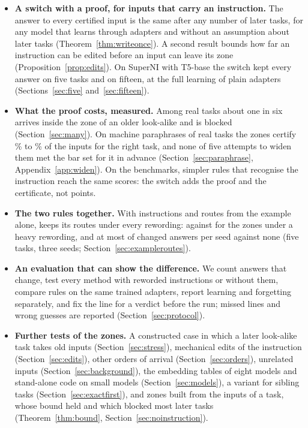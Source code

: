 \begin{itemize}
  then forget \AudFullGainloraFTInt{} and \AudFullInfloraFTInt{} points
  (Sections~\ref{sec:nodefpublished} and~\ref{sec:nodeftrained}).
  \item \textbf{A switch with a proof, for inputs that carry an instruction.} The answer to every
  certified input is the same after any number of later tasks, for any model that learns through
  adapters and without an assumption about later tasks (Theorem~\ref{thm:writeonce}). A second
  result bounds how far an instruction can be edited before an input can leave its zone
  (Proposition~\ref{prop:edits}). On SuperNI with T5-base the switch kept every answer on five
  tasks and on fifteen, at the full learning of plain adapters (Sections~\ref{sec:five}
  and~\ref{sec:fifteen}).
  \item \textbf{What the proof costs, measured.} Among \ManyTasks{} real tasks about one in six
  arrives inside the zone of an older look-alike and is blocked (Section~\ref{sec:many}). On machine
  paraphrases of \WidenTasksEval{} real tasks the zones certify \WidenRefTfivePLow{}\% to
  \WidenRefTfivePHigh{}\% of the inputs for the right task, and none of five attempts to widen them
  met the bar set for it in advance (Section~\ref{sec:paraphrase}, Appendix~\ref{app:widen}). On the
  benchmarks, simpler rules that recognise the instruction reach the same scores: the switch adds
  the proof and the certificate, not points.
  \item \textbf{The two rules together.} With instructions and routes from the example alone,
  \recog{} keeps its routes under every rewording: \AudUThreeHeavyRidgeAPOne{} against
  \AudUThreeHeavyCertAPOne{} for the zones under a heavy rewording, and at most \AudUThreeMaxChangedPerSeed{} of
  \AudUCompared{} changed answers per seed against none (five tasks, three seeds;
  Section~\ref{sec:exampleroutes}).
  \item \textbf{An evaluation that can show the difference.} We count answers that change, test
  every method with reworded instructions or without them, compare rules on the same trained
  adapters, report learning and forgetting separately, and fix the line for a verdict before the
  run; missed lines and wrong guesses are reported (Section~\ref{sec:protocol}).
  \item \textbf{Further tests of the zones.} A constructed case in which a later look-alike task
  takes old inputs (Section~\ref{sec:stress}), mechanical edits of the instruction
  (Section~\ref{sec:edits}), other orders of arrival (Section~\ref{sec:orders}), unrelated inputs
  (Section~\ref{sec:background}), the embedding tables of eight models and stand-alone code on small
  models (Section~\ref{sec:models}), a variant for sibling tasks (Section~\ref{sec:exactfirst}), and
  zones built from the inputs of a task, whose bound held and which blocked most later tasks
  (Theorem~\ref{thm:bound}, Section~\ref{sec:noinstruction}).
\end{itemize}


